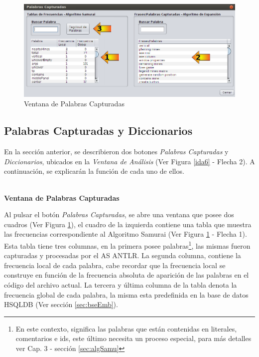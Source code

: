 \begin{figure}[t] %
\centerline{%
\includegraphics[scale= 0.55]{./cap4/ida_07.png}
}
\caption{Ventana de Palabras Capturadas}
\label{ida7}
\end{figure}

\subsection{Palabras Capturadas y Diccionarios}
\label{sec:panPalDicc}

En la sección anterior, se describieron dos botones \textit{Palabras Capturadas} y \textit{Diccionarios}, ubicados en la \textit{Ventana de Análisis} (Ver Figura \ref{ida6} - Flecha 2). A continuación, se explicarán la función de cada uno de ellos.

\noindent \textbf{\\Ventana de Palabras Capturadas\\} 

Al pulsar el botón \textit{Palabras Capturadas}, se abre una ventana que posee dos cuadros (Ver Figura \ref{ida7}), el cuadro de la izquierda contiene una tabla que muestra las frecuencias correspondiente al Algoritmo Samurai (Ver Figura \ref{ida7} - Flecha 1). Esta tabla tiene tres columnas, en la primera posee palabras\footnote[1]{En este contexto, significa las palabras que están contenidas en literales, comentarios e ids, este último necesita un proceso especial, para más detalles ver Cap. 3 - sección \ref{sec:algSamu}}, las mismas fueron capturadas y procesadas por el AS ANTLR. La segunda columna, contiene la frecuencia local de cada palabra, cabe recordar que la frecuencia local se construye en función de la frecuencia absoluta de aparición de las palabras en el código del archivo actual. La tercera y última columna de la tabla denota la frecuencia global de cada palabra, la misma esta predefinida en la base de datos HSQLDB (Ver sección \ref{sec:bseEmb}).

